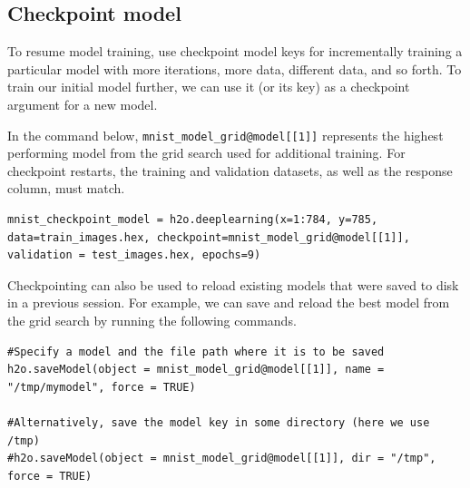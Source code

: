 \documentclass{article}[11pt]
\begin{document}


\subsection{Checkpoint model}

To resume model training, use checkpoint model keys for incrementally training a particular model with more iterations, more data, different data, and so forth. To train our initial model further, we can use it (or its key) as a checkpoint argument for a new model.

In the command below, \texttt{mnist\_model\_grid@model[[1]]} represents the highest performing model from the grid search used for additional training. For checkpoint restarts, the training and validation datasets, as well as the response column, must match.

\begin{lstlisting}[breaklines,basicstyle=\ttfamily]
mnist_checkpoint_model = h2o.deeplearning(x=1:784, y=785, data=train_images.hex, checkpoint=mnist_model_grid@model[[1]], validation = test_images.hex, epochs=9)

\end{lstlisting}
\noindent
Checkpointing can also be used to reload existing models that were saved to disk in a previous session. For example, we can save and reload the best model from the grid search by running the following commands.

\begin{lstlisting}[breaklines,basicstyle=\ttfamily]
#Specify a model and the file path where it is to be saved
h2o.saveModel(object = mnist_model_grid@model[[1]], name = "/tmp/mymodel", force = TRUE)

#Alternatively, save the model key in some directory (here we use /tmp)
#h2o.saveModel(object = mnist_model_grid@model[[1]], dir = "/tmp", force = TRUE)

\end{lstlisting}
\normalsize
\end{document}
